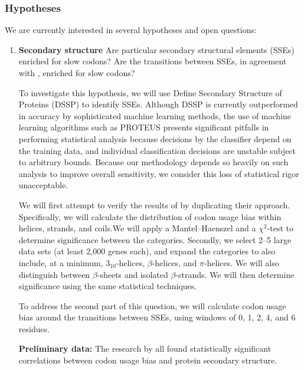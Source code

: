 \documentclass[11pt]{nih}
\newcommand{\todo}[1]{
\addcontentsline{tdo}{todo}{\protect{#1}}
\textcolor{red}{TODO: #1}
}
\begin{document}
\subsubsection{Hypotheses}
We are currently interested in several hypotheses and open questions:
\begin{enumerate}
\item \textbf{Secondary structure}
Are particular secondary structural elements (SSEs) enriched for slow codons? Are the transitions between SSEs, in agreement with \citet{Saunders2010}, enriched for slow codons?

To investigate this hypothesis, we will use Define Secondary Structure of Proteins (DSSP) \citep{Joosten2011,Kabsch1983} to identify SSEs. Although DSSP is currently outperformed in accuracy by sophisticated machine learning methods, the use of machine learning algorithms such as PROTEUS presents significant pitfalls in performing statistical analysis because decisions by the classifier depend on the training data, and individual classification decisions are unstable subject to arbitrary bounds. Because our methodology depends so heavily on such analysis to improve overall sensitivity, we consider this loss of statistical rigor unacceptable.

We will first attempt to verify the results of \citet{Saunders2010} by duplicating their approach. Specifically, we will calculate the distribution of codon usage bias within helices, strands, and coils.We will apply a Mantel--Haenszel and a $\chi^2$-test to determine significance between the categories. Secondly, we select 2--5 large data sets (at least 2,000 genes each), and expand the categories to also include, at a minimum, $3_{10}$-helices, $\beta$-helices, and $\pi$-helices. We will also distinguish between $\beta$-sheets and isolated $\beta$-strands. We will then determine significance using the same statistical techniques.

To address the second part of this question, we will calculate codon usage bias around the transitions between SSEs, using windows of 0, 1, 2, 4, and 6 residues.

\textbf{Preliminary data:} The research by \citet{Saunders2010,Oresic2003,Gu2003,Thanaraj1996a} all found statistically significant correlations between codon usage bias and protein secondary structure.


\end{enumerate}
\end{document}
